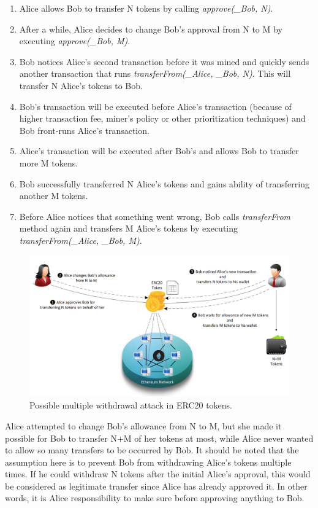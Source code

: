 \begin{enumerate}
	\item Alice allows Bob to transfer N tokens by calling \textit{approve(\_Bob, N)}.
	\item After a while, Alice decides to change Bob's approval from N to M by executing \textit{approve(\_Bob, M)}.
	\item Bob notices Alice’s second transaction before it was mined and quickly sends another transaction that runs \textit{transferFrom(\_Alice, \_Bob, N)}. This will transfer N Alice’s tokens to Bob.
	\item Bob’s transaction will be executed before Alice’s transaction (because of higher transaction fee, miner’s policy or other prioritization techniques) and Bob front-runs Alice’s transaction.
	\item Alice’s transaction will be executed after Bob’s and allows Bob to transfer more M tokens.
	\item Bob successfully transferred N Alice’s tokens and gains ability of transferring another M tokens.
	\item Before Alice notices that something went wrong, Bob calls \textit{transferFrom} method again and transfers M Alice’s tokens by executing \textit{transferFrom(\_Alice, \_Bob, M)}.\newline
\end{enumerate}
\begin{figure}[h]
	\includegraphics[width=1.0\linewidth]{figures/multiple_withdrawal_02.png}
	\caption{Possible multiple withdrawal attack in ERC20 tokens.}
\end{figure}
Alice attempted to change Bob’s allowance from N to M, but she made it possible for Bob to transfer N+M of her tokens at most, while Alice never wanted to allow so many transfers to be occurred by Bob. It should be noted that the assumption here is to prevent Bob from withdrawing Alice’s tokens multiple times. If he could withdraw N tokens after the initial Alice’s approval, this would be considered as legitimate transfer since Alice has already approved it. In other words, it is Alice responsibility to make sure before approving anything to Bob. 

